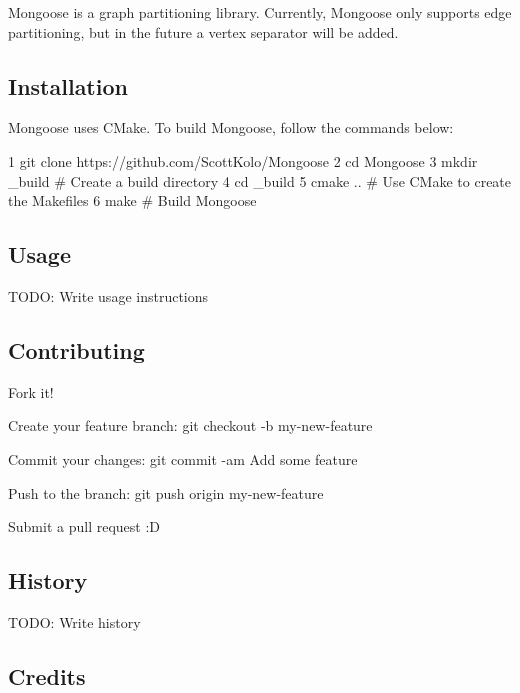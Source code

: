 \href{https://travis-ci.com/ScottKolo/Mongoose}{\tt } \href{https://codecov.io/gh/ScottKolo/Mongoose}{\tt }

Mongoose is a graph partitioning library. Currently, Mongoose only supports edge partitioning, but in the future a vertex separator will be added.

\subsection*{Installation}

Mongoose uses C\+Make. To build Mongoose, follow the commands below\+:


\begin{DoxyCode}
1 git clone https://github.com/ScottKolo/Mongoose
2 cd Mongoose
3 mkdir \_build # Create a build directory
4 cd \_build 
5 cmake ..     # Use CMake to create the Makefiles
6 make         # Build Mongoose
\end{DoxyCode}


\subsection*{Usage}

T\+O\+DO\+: Write usage instructions

\subsection*{Contributing}


\begin{DoxyEnumerate}
\item Fork it!
\item Create your feature branch\+: {\ttfamily git checkout -\/b my-\/new-\/feature}
\item Commit your changes\+: {\ttfamily git commit -\/am \textquotesingle{}Add some feature\textquotesingle{}}
\item Push to the branch\+: {\ttfamily git push origin my-\/new-\/feature}
\item Submit a pull request \+:D
\end{DoxyEnumerate}

\subsection*{History}

T\+O\+DO\+: Write history

\subsection*{Credits}

